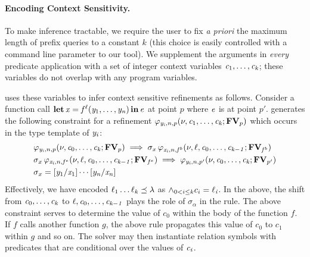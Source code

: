 \paragraph{Encoding Context Sensitivity.}
To make inference tractable, we require the user to fix \emph{a
  priori} the maximum length of prefix queries to a constant $k$ (this
choice is easily controlled with a command line parameter to our tool). We
supplement the arguments in \emph{every} predicate application with a set of
integer context variables $ \mathit{c_{{\mathrm{1}}}} ,\ldots, \mathit{c_{\mathit{k}}} $; these variables do not
overlap with any program variables.

\name uses these variables to infer context sensitive
refinements as follows. Consider a function call
$ \operatorname{\mathbf{let}}  \mathit{x}  =   \mathit{f} ^ \ell (  \mathit{y_{{\mathrm{1}}}} ,\ldots, \mathit{y_{\mathit{n}}}  )   \operatorname{\mathbf{in}}  \mathit{e} $ at point $p$
where $\mathit{e}$ is at point $p'$.
\name generates the following constraint for a refinement
$  \varphi _{ \mathit{y_{\mathit{i}}} , n , p }  ( \nu ,  \mathit{c_{{\mathrm{1}}}} ,\ldots, \mathit{c_{\mathit{k}}}  ;  \mathbf{FV} _{ p }  ) $ which occurs in the type template of $\mathit{y_{\mathit{i}}}$:
\begin{align*}
  &     \varphi _{ \mathit{y_{\mathit{i}}} , n , p }  ( \nu ,  \mathit{c_{{\mathrm{0}}}} ,\ldots, \mathit{c_{\mathit{k}}}  ;  \mathbf{FV} _{ p }  )   \implies  \sigma_{x} \, \varphi _{ \mathit{x_{\mathit{i}}} , n ,  { \mathit{f} ^{b} }  }  ( \nu , \ell  ,   \mathit{c_{{\mathrm{0}}}} ,\ldots, \mathit{c_{{\mathit{k}-1}}}  ;  \mathbf{FV} _{  { \mathit{f} ^{b} }  }  )  \\
  &     \sigma_{x} \, \varphi _{ \mathit{x_{\mathit{i}}} , n ,  { \mathit{f} ^{e} }  }  ( \nu , \ell  ,   \mathit{c_{{\mathrm{0}}}} ,\ldots, \mathit{c_{{\mathit{k}-1}}}  ;  \mathbf{FV} _{  { \mathit{f} ^{e} }  }  )   \implies  \varphi _{ \mathit{y_{\mathit{i}}} , n , p' }  ( \nu ,  \mathit{c_{{\mathrm{0}}}} ,\ldots, \mathit{c_{\mathit{k}}}  ;  \mathbf{FV} _{ p' }  )  \\
  & \sigma_{x}  =    [  \mathit{y_{{\mathrm{1}}}}  /  \mathit{x_{{\mathrm{1}}}}  ]  \cdots  [  \mathit{y_{\mathit{n}}}  /  \mathit{x_{\mathit{n}}}  ]  
\end{align*}
Effectively, we have encoded $   \ell_{{\mathrm{1}}} \ldots \ell_{\mathit{k}}      \preceq    \lambda $ as $\land_{0<i\leq k} c_i = \ell_{\mathit{i}}$.
In the above, the shift from $ \mathit{c_{{\mathrm{0}}}} ,\ldots, \mathit{c_{\mathit{k}}} $ to $\ell  ,   \mathit{c_{{\mathrm{0}}}} ,\ldots, \mathit{c_{{\mathit{k}-1}}} $ plays the role of
$\sigma_{\alpha}$ in the  rule. The above constraint serves to
determine the value of $\mathit{c_{{\mathrm{0}}}}$ within the body of the function $\mathit{f}$.
If $\mathit{f}$ calls another function $\mathit{g}$, the above rule
propagates this value of $\mathit{c_{{\mathrm{0}}}}$ to $\mathit{c_{{\mathrm{1}}}}$ within $\mathit{g}$ and so on.
The solver may then instantiate relation symbols with predicates
that are conditional over the values of $\mathit{c_{\mathit{i}}}$.


